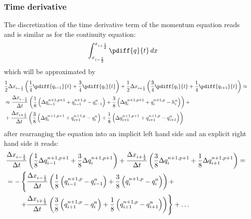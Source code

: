 \subsubsection{Time derivative}
The discretization of the time derivative term of the momentum equation reads and is similar as for the continuity equation:
\begin{align}
    & \int^{x_{i+\half}}_{x_{i-\half}} \pdiff{q}{t}\, dx
\end{align}
which will be approximated by
\begin{align}
    &\half \Delta x_{i-\half} \left( \frac{1}{4}\pdiff{q_{i-1}}{t} + \frac{3}{4}\pdiff{q_{i}}{t}  \right) +
    \half \Delta x_{i+\half} \left( \frac{3}{4}\pdiff{q_{i}}{t} + \frac{1}{4}\pdiff{q_{i+1}}{t} \right) \approx
    \nonumber \\*
    & \approx
    \frac{\Delta x_{i-\half}}{\Dt} \left(
    \frac{1}{8}\left(\Delta q^{n+1,p+1}_{i-1} + q^{n+1,p}_{i-1} - q^{n}_{i-1} \right) + \frac{3}{8}\left(\Delta q^{n+1,p+1}_{i} + q^{n+1,p}_{i}- h^{n}_{i}\right)
    \right) +
    \nonumber \\*
    & +
    \frac{\Delta x_{i+\half}}{\Dt} \left( \frac{3}{8}\left(\Delta q^{n+1,p+1}_{i} + q^{n+1,p}_{i+1}- q^{n}_{i}\right) +
    \frac{1}{8}\left(\Delta q^{n+1,p+1}_{i+1} + q^{n+1,p}_{i+1}- q^{n}_{i+1}\right)
    \right)
\end{align}
after rearranging the equation into an implicit left hand side and an explicit right hand side  it reads:
\begin{align}
    &  \frac{\Delta x_{i-\frac{1}{2}}}{\Delta t} \left(
    \frac{1}{8}\Delta q^{n+1,p+1}_{i-1} + \frac{3}{8}\Delta q^{n+1,p+1}_{i}
    \right) +
    \frac{\Delta x_{i+\frac{1}{2}}}{\Delta t} \left( \frac{3}{8}\Delta q^{n+1,p+1}_{i} + \frac{1}{8}\Delta q^{n+1,p+1}_{i+1}
    \right) =
    \nonumber \\
    &  = -\left\{
    \frac{\Delta x_{i-\frac{1}{2}}}{\Delta t} \left(
    \frac{1}{8}\left(q^{n+1,p}_{i-1} - q^{n}_{i-1} \right) + \frac{3}{8}\left(q^{n+1,p}_{i}- q^{n}_{i}\right)
    \right) + \right.
    \nonumber \\*
    & \qquad \left. +
    \frac{\Delta x_{i+\frac{1}{2}}}{\Delta t} \left( \frac{3}{8}\left(q^{n+1,p}_{i+1}- q^{n}_{i}\right) + \frac{1}{8}\left(q^{n+1,p}_{i+1}- q^{n}_{i+1}\right)
    \right)\right\}
    + \dots
\end{align}

